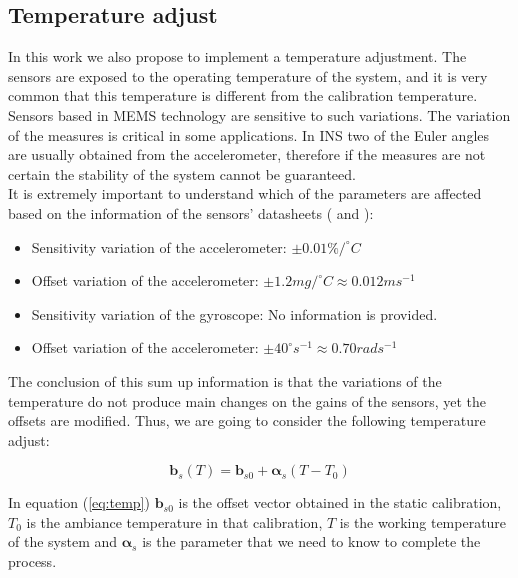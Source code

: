 \documentclass[conference]{IEEEtran}
\newcommand{\refp}[1]{(\ref{#1})}
\begin{document}
\subsection{Temperature adjust}
\label{sec:param_temp}

In this work we also propose to implement a temperature adjustment. The sensors are exposed to the operating temperature of the system, and it is very common that this temperature is different from the calibration temperature. Sensors based in MEMS technology are sensitive to such variations. The variation of the measures is critical in some applications. In INS two of the Euler angles are usually obtained from the accelerometer, therefore if the measures are not certain the stability of the system cannot be guaranteed.\\

It is extremely important to understand which of the parameters are affected based on the information of the sensors' datasheets (\cite{bib:acc_data} and \cite{bib:gyro_data}):

\begin{itemize}
\item Sensitivity variation of the accelerometer: $\pm 0.01 \%/^\circ C$
\item Offset variation of the accelerometer: $\pm 1.2mg/^\circ C \approx 0.012m s^{-1}$
\item Sensitivity variation of the gyroscope: No information is provided. 
\item Offset variation of the accelerometer: $\pm 40 ^\circ s^{-1} \approx 0.70 rad s^{-1}$
\end{itemize}

The conclusion of this sum up information is that the variations of the temperature do not produce main changes on the gains of the sensors, yet the offsets are modified. Thus, we are going to consider the following temperature adjust:

\begin{equation}
\mathbf{b}_s(T) = \mathbf{b}_{s0} + \boldsymbol{\alpha}_s (T-T_0)
\label{eq:temp}
\end{equation}

In equation \refp{eq:temp} $\mathbf{b}_{s0}$ is the offset vector obtained in the static calibration, $T_0$ is the ambiance temperature in that calibration, $T$ is the working temperature of the system and $\boldsymbol{\alpha}_s$ is the parameter that we need to know to complete the process.\\ 
\end{document}
